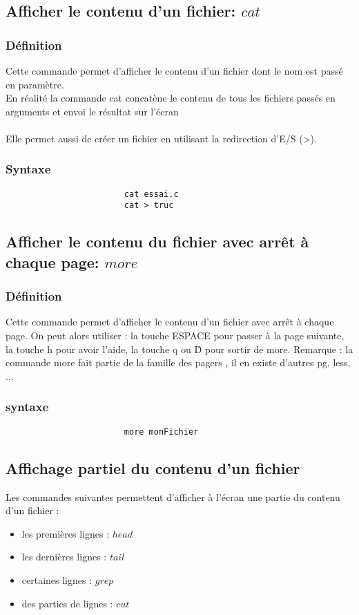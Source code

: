 			
			\subsection{Afficher le contenu d'un fichier: $cat$}
				\subsubsection{Définition}
					Cette commande permet d'afficher le contenu d'un fichier dont le nom est passé en paramètre.\\
					En réalité la commande cat concatène le contenu de tous les fichiers passés en arguments et envoi le résultat sur l'écran  \\ \\
	
					Elle permet aussi de créer un fichier en utilisant la redirection d'E/S (>).

				 \subsubsection{Syntaxe}
				 	\begin{verbatim}
				 		cat essai.c
				 		cat > truc
					\end{verbatim}
			\subsection{Afficher le contenu du fichier avec arrêt à chaque page: $more$}			
				\subsubsection{Définition}
					Cette commande permet d'afficher le contenu d'un fichier avec arrêt à chaque page.
					On peut alors utiliser : 
					la touche ESPACE pour passer à la page suivante,
					la touche h pour avoir l'aide, 
					la touche q ou \^D pour sortir de more.
					Remarque : la commande more fait partie de la famille des pagers , il en existe d'autres pg, less, ...
				\subsubsection{syntaxe}
					\begin{verbatim}
				 		more monFichier
					\end{verbatim}
			\subsection{Affichage partiel du contenu d'un fichier}			
				Les commandes suivantes permettent d'afficher à l'écran  une partie du contenu d'un fichier :
				\begin{itemize}
					\item les premières lignes : $head$
					\item les dernières lignes : $tail$
					\item certaines lignes : $grep$
					\item des parties de lignes : $cut$
				\end{itemize}
